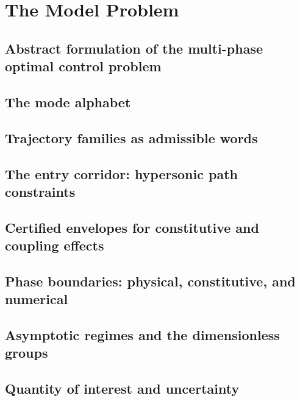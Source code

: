
\section{The Model Problem}
\label{sec:model}

\subsection{Abstract formulation of the multi-phase optimal control problem}
\label{sub:abstract_formulation}

\subsection{The mode alphabet}
\label{sub:mode_alphabet}

\subsection{Trajectory families as admissible words}
\label{sub:trajectory_families_as_words}

\subsection{The entry corridor: hypersonic path constraints}
\label{sub:entry_corridor}

\subsection{Certified envelopes for constitutive and coupling effects}
\label{sub:certified_envelopes}

\subsection{Phase boundaries: physical, constitutive, and numerical}
\label{sub:phase_boundaries}

\subsection{Asymptotic regimes and the dimensionless groups}
\label{sub:asymptotic_regimes}

\subsection{Quantity of interest and uncertainty}
\label{sub:quantity_of_interest_and_uncertainty}
